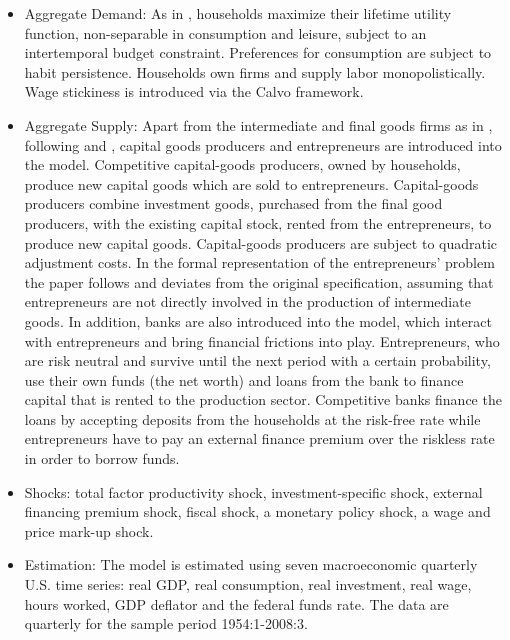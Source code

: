 \documentclass[11pt,a4paper]{article}
\begin{document}
	\begin{itemize}
		
		\item Aggregate Demand: As in \cite{SmetsWouters2007}, households maximize their lifetime utility function, non-separable in consumption and leisure, subject to an intertemporal budget constraint. Preferences for consumption are subject to habit persistence. Households own firms and supply labor monopolistically. Wage stickiness is introduced via the Calvo framework.
		
		\item Aggregate Supply: Apart from the intermediate and final goods firms as in \cite{SmetsWouters2007}, following \cite{BernankeGertlerGilchrist1999} and \cite{ChristianoMottoRostagno2003}, capital goods producers and entrepreneurs are introduced into the model. Competitive capital-goods producers, owned by households, produce new capital goods which are sold to entrepreneurs. Capital-goods producers combine investment goods, purchased from the final good producers, with the existing capital stock, rented from the entrepreneurs, to produce new capital goods. Capital-goods producers are subject to quadratic adjustment costs. In the formal representation of the entrepreneurs' problem the paper follows \cite{christiano2010financial} and deviates from the original \cite{BernankeGertlerGilchrist1999} specification, assuming that entrepreneurs are not directly involved in the production of intermediate goods. In addition, banks are also introduced into the model, which interact with entrepreneurs and bring financial frictions into play. Entrepreneurs, who are risk neutral and survive until the next period with a certain probability, use their own funds (the net worth) and loans from the bank to finance capital that is rented to the production sector. Competitive banks finance the loans by accepting deposits from the households at the risk-free rate while entrepreneurs have to pay an external finance premium over the riskless rate in order to borrow funds.
		
		\item Shocks: total factor productivity shock, investment-specific shock, external financing premium shock, fiscal shock, a monetary policy shock, a wage and price mark-up shock.
		
		\item Estimation: The model is estimated using seven macroeconomic quarterly U.S. time series: real GDP, real consumption, real investment, real wage, hours worked, GDP deflator and the federal funds rate. The data are quarterly for the sample period 1954:1-2008:3.
		
	\end{itemize}
	
\end{document}
